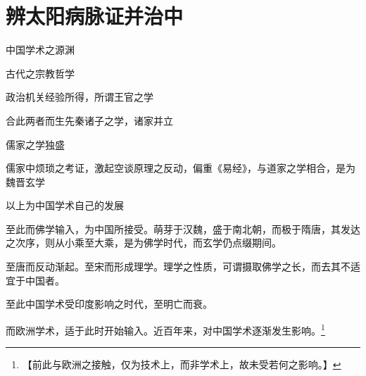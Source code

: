 \chapter{辨太阳病脉证并治\hspace{0.5em}中}

中国学术之源渊

\hspace{2em}古代之宗教哲学

\hspace{2em}政治机关经验所得，所谓王官之学

合此两者而生先秦诸子之学，诸家并立

儒家之学独盛

儒家中烦琐之考证，激起空谈原理之反动，偏重《易经》，与道家之学相合，是为魏晋玄学

以上为中国学术自己的发展

至此而佛学输入，为中国所接受。萌芽于汉魏，盛于南北朝，而极于隋唐，其发达之次序，则从小乘至大乘，是为佛学时代，而玄学仍点缀期间。

至唐而反动渐起。至宋而形成理学。理学之性质，可谓摄取佛学之长，而去其不适宜于中国者。

至此中国学术受印度影响之时代，至明亡而衰。

而欧洲学术，适于此时开始输入。近百年来，对中国学术逐渐发生影响。\footnote{【前此与欧洲之接触，仅为技术上，而非学术上，故未受若何之影响。】}

